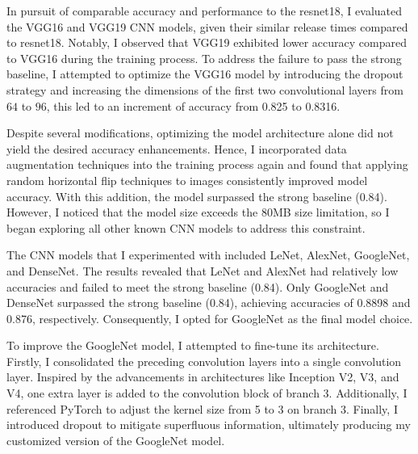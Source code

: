 \documentclass[a4paper, 12pt]{article}
\begin{document}
In pursuit of comparable accuracy and performance to the resnet18, I evaluated the VGG16\cite{simonyan2015deep} and VGG19\cite{simonyan2015deep} CNN models, given their similar release times compared to resnet18. Notably, I observed that VGG19 exhibited lower accuracy compared to VGG16 during the training process. To address the failure to pass the strong baseline,  I attempted to optimize the VGG16 model by introducing the dropout strategy and increasing the dimensions of the first two convolutional layers from $64$ to $96$, this led to an increment of accuracy from 0.825 to 0.8316.

Despite several modifications, optimizing the model architecture alone did not yield the desired accuracy enhancements. Hence, I incorporated data augmentation techniques into the training process again and found that applying random horizontal flip techniques to images consistently improved model accuracy. With this addition, the model surpassed the strong baseline (0.84). However, I noticed that the model size exceeds the 80MB size limitation, so I began exploring all other known CNN models to address this constraint.

\vspace{2em}

The CNN models that I experimented with included LeNet\cite{726791}, AlexNet\cite{NIPS2012_c399862d}, GoogleNet\cite{szegedy2014going}, and DenseNet\cite{huang2018densely}. The results revealed that LeNet and AlexNet had relatively low accuracies and failed to meet the strong baseline (0.84). Only GoogleNet and DenseNet surpassed the strong baseline (0.84), achieving accuracies of 0.8898 and 0.876, respectively. Consequently, I opted for GoogleNet as the final model choice.

To improve the GoogleNet model, I attempted to fine-tune its architecture. Firstly, I consolidated the preceding convolution layers into a single convolution layer.  Inspired by the advancements in architectures like Inception V2, V3, and V4, one extra layer is added to the convolution block of branch 3. Additionally, I referenced PyTorch to adjust the kernel size from 5 to 3 on branch 3. Finally, I introduced dropout to mitigate superfluous information, ultimately producing my customized version of the GoogleNet model.



\end{document}
